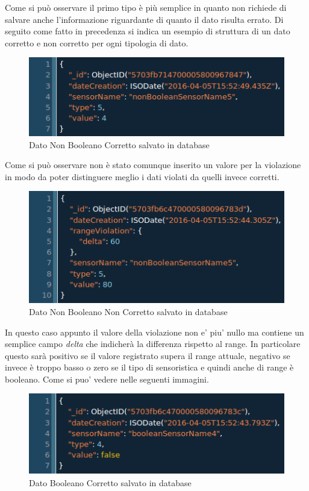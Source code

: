 Come si pu\`o osservare il primo tipo \`e pi\`u semplice in quanto non richiede di salvare anche l'informazione riguardante di quanto il dato risulta errato. Di seguito come fatto in precedenza si indica un esempio di struttura di un dato corretto e non corretto per ogni tipologia di dato.

\begin{figure}[ht]
\centering
\includegraphics[scale=0.5,natwidth=610,natheight=642]{Figures/DataStructures/DataNoViolation.png}
\caption{Dato Non Booleano Corretto salvato in database}
\end{figure}

Come si pu\`o osservare non \`e stato comunque inserito un valore per la violazione in modo da poter distinguere meglio i dati violati da quelli invece corretti.

\begin{figure}[ht]
\centering
\includegraphics[scale=0.5,natwidth=610,natheight=642]{Figures/DataStructures/DataViolation.png}
\caption{Dato Non Booleano Non Corretto salvato in database}
\end{figure}

In questo caso appunto il valore della violazione non e' piu' nullo ma contiene un semplice campo \textit{delta} che indicher\`a la differenza rispetto al range. In particolare questo sar\`a positivo se il valore registrato supera il range attuale, negativo se invece \`e troppo basso o zero se il tipo di sensoristica e quindi anche di range \`e booleano. Come si puo' vedere nelle seguenti immagini.

\begin{figure}[ht]
\centering
\includegraphics[scale=0.5,natwidth=610,natheight=642]{Figures/DataStructures/BooleanDataNoViolation.png}
\caption{Dato Booleano Corretto salvato in database}
\end{figure}

